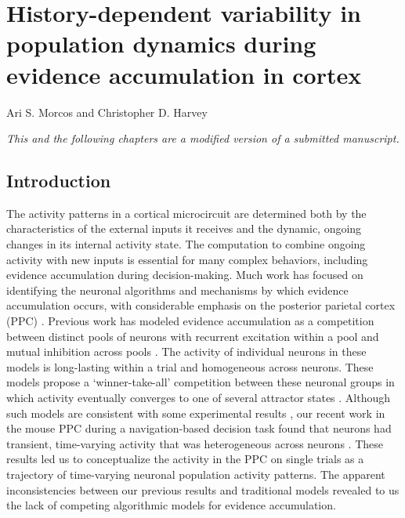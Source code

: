 \chapter{History-dependent variability in population dynamics during evidence accumulation in cortex} \label{chapter_3}

\vspace*{-44pt}

Ari S. Morcos and Christopher D. Harvey

\smallskip
\textit{This and the following chapters are a modified version of a submitted manuscript.}

\vspace*{50pt}

\section{Introduction} \label{sec:chap3_intro}

The activity patterns in a cortical microcircuit are determined both by the characteristics of the external inputs it receives and the dynamic, ongoing changes in its internal activity state. The computation to combine ongoing activity with new inputs is essential for many complex behaviors, including evidence accumulation during decision-making. Much work has focused on identifying the neuronal algorithms and mechanisms by which evidence accumulation occurs, with considerable emphasis on the posterior parietal cortex (PPC) \citep{Shadlen:1996ga, Gold:2000hp, Yang:2007in, Hanks:2015fy, Britten:1992wx}. Previous work has modeled evidence accumulation as a competition between distinct pools of neurons with recurrent excitation within a pool and mutual inhibition across pools \citep{Wong:2006in, Wang:2002kn}. The activity of individual neurons in these models is long-lasting within a trial and homogeneous across neurons. These models propose a ‘winner-take-all’ competition between these neuronal groups in which activity eventually converges to one of several attractor states \citep{Wong:2006in, Machens:2005en, Wang:2002kn}. Although such models are consistent with some experimental results \citep{Shadlen:1996ga, Gold:2000hp, Yang:2007in, Hanks:2015fy, Britten:1992wx, Horwitz:1999ws}, our recent work in the mouse PPC during a navigation-based decision task found that neurons had transient, time-varying activity that was heterogeneous across neurons \citep{Harvey:2012du}. These results led us to conceptualize the activity in the PPC on single trials as a trajectory of time-varying neuronal population activity patterns. The apparent inconsistencies between our previous results and traditional models revealed to us the lack of competing algorithmic models for evidence accumulation. 

